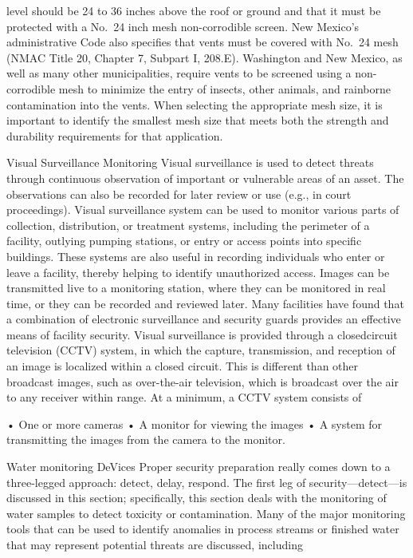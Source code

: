 \documentclass{article}
\begin{document}
level should be 24 to 36 inches above the roof or ground and that it
must be protected with a No.~24 inch mesh non-corrodible screen. New
Mexico's administrative Code also specifies that vents must be covered
with No.~24 mesh (NMAC Title 20, Chapter 7, Subpart I, 208.E).
Washington and New Mexico, as well as many other municipalities, require
vents to be screened using a non-corrodible mesh to minimize the entry
of insects, other animals, and rainborne contamination into the vents.
When selecting the appropriate mesh size, it is important to identify
the smallest mesh size that meets both the strength and durability
requirements for that application.

Visual Surveillance Monitoring Visual surveillance is used to detect
threats through continuous observation of important or vulnerable areas
of an asset. The observations can also be recorded for later review or
use (e.g., in court proceedings). Visual surveillance system can be used
to monitor various parts of collection, distribution, or treatment
systems, including the perimeter of a facility, outlying pumping
stations, or entry or access points into specific buildings. These
systems are also useful in recording individuals who enter or leave a
facility, thereby helping to identify unauthorized access. Images can be
transmitted live to a monitoring station, where they can be monitored in
real time, or they can be recorded and reviewed later. Many facilities
have found that a combination of electronic surveillance and security
guards provides an effective means of facility security. Visual
surveillance is provided through a closedcircuit television (CCTV)
system, in which the capture, transmission, and reception of an image is
localized within a closed circuit. This is different than other
broadcast images, such as over-the-air television, which is broadcast
over the air to any receiver within range. At a minimum, a CCTV system
consists of

• One or more cameras • A monitor for viewing the images • A system for
transmitting the images from the camera to the monitor.

Water monitoring DeVices Proper security preparation really comes down
to a three-legged approach: detect, delay, respond. The first leg of
security---detect---is discussed in this section; specifically, this
section deals with the monitoring of water samples to detect toxicity or
contamination. Many of the major monitoring tools that can be used to
identify anomalies in process streams or finished water that may
represent potential threats are discussed, including
\end{document}

